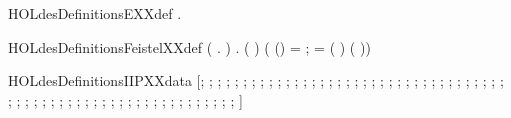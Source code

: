 \newcommand{\HOLdesDefinitionsEXXdata}{\UseVerbatim{HOLdesDefinitionsEXXdata}}
\begin{SaveVerbatim}{HOLdesDefinitionsEXXdef}
\HOLTokenTurnstile{} \HOLSymConst{\HOLTokenForall{}}.   \HOLSymConst{=}   
\end{SaveVerbatim}
\newcommand{\HOLdesDefinitionsEXXdef}{\UseVerbatim{HOLdesDefinitionsEXXdef}}
\begin{SaveVerbatim}{HOLdesDefinitionsFeistelXXdef}
\HOLTokenTurnstile{} (\HOLSymConst{\HOLTokenForall{}}   .       \HOLSymConst{=} ) \HOLSymConst{\HOLTokenConj{}}
   \HOLSymConst{\HOLTokenForall{}}    .
       ( )    \HOLSymConst{=}
     (
        (\HOLSymConst{,}) =      ;
         =   
           \HOLSymConst{=}   ( \HOLSymConst{\HOLTokenEor{}}   \HOLSymConst{,})  (\HOLSymConst{,} \HOLSymConst{\HOLTokenEor{}}   ))
\end{SaveVerbatim}
\newcommand{\HOLdesDefinitionsFeistelXXdef}{\UseVerbatim{HOLdesDefinitionsFeistelXXdef}}
\begin{SaveVerbatim}{HOLdesDefinitionsIIPXXdata}
\HOLTokenTurnstile{}  \HOLSymConst{=}
   [; ; ; ; ; ; ; ; ; ; ; ; ; ; ;
    ; ; ; ; ; ; ; ; ; ; ; ; ; ; ;
    ; ; ; ; ; ; ; ; ; ; ; ; ; ; ;
    ; ; ; ; ; ; ; ; ; ; ; ; ; ; ; ;
    ; ; ]
\end{SaveVerbatim}

